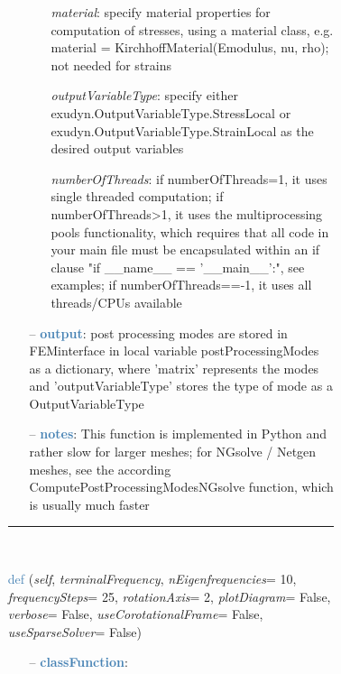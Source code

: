 \begin{itemize}[leftmargin=1.4cm]
\begin{itemize}[leftmargin=1.4cm]
\begin{itemize}[leftmargin=0.5cm]
\begin{itemize}[leftmargin=1.4cm]
\begin{itemize}[leftmargin=1.4cm]
\begin{itemize}[leftmargin=0.5cm]
\begin{itemize}[leftmargin=0.7cm]
\begin{itemize}[leftmargin=1.2cm]
\setlength{\itemindent}{-0.7cm}
    \item[] {\it material}: specify material properties for computation of stresses, using a material class, e.g. material = KirchhoffMaterial(Emodulus, nu, rho); not needed for strains
    \item[] {\it   outputVariableType}: specify either exudyn.OutputVariableType.StressLocal or exudyn.OutputVariableType.StrainLocal as the desired output variables
    \item[] {\it   numberOfThreads}: if numberOfThreads=1, it uses single threaded computation; if numberOfThreads>1, it uses the multiprocessing pools functionality, which requires that all code in your main file must be encapsulated within an if clause "if \_\_name\_\_ == '\_\_main\_\_':", see examples; if numberOfThreads==-1, it uses all threads/CPUs available
  \end{itemize}
  \item[--]  \textcolor{steelblue}{\bf output}: post processing modes are stored in FEMinterface in local variable postProcessingModes as a dictionary, where 'matrix' represents the modes and 'outputVariableType' stores the type of mode as a OutputVariableType  \item[--]  \textcolor{steelblue}{\bf notes}: This function is implemented in Python and rather slow for larger meshes; for NGsolve / Netgen meshes, see the according ComputePostProcessingModesNGsolve function, which is usually much faster\vspace{12pt}\end{itemize}
%
\noindent\rule{8cm}{0.75pt}\vspace{1pt} \\ 
\begin{flushleft}
\noindent \textcolor{steelblue}{def {\bf {}}}\label{sec:FEM:FEMinterface:ComputeCampbellDiagram}
({\it self}, {\it terminalFrequency}, {\it nEigenfrequencies}= 10, {\it frequencySteps}= 25, {\it rotationAxis}= 2, {\it plotDiagram}= False, {\it verbose}= False, {\it useCorotationalFrame}= False, {\it useSparseSolver}= False)
\end{flushleft}
\setlength{\itemindent}{0.7cm}
\begin{itemize}[leftmargin=0.7cm]
  \item[--]  \textcolor{steelblue}{\bf classFunction}: \vspace{-6pt}
  \begin{itemize}[leftmargin=1.2cm]

\end{itemize}
\end{itemize}
\end{itemize}
\end{itemize}
\end{itemize}
\end{itemize}
\end{itemize}
\end{itemize}
